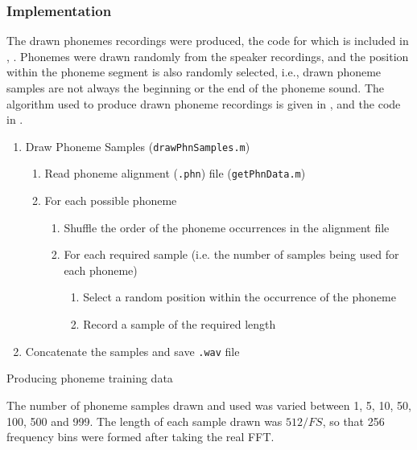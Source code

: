 \subsubsection*{Implementation}

The drawn phonemes recordings were produced, the code for which is
included in , \textit{}.
Phonemes were drawn randomly from the speaker recordings, and the
position within the phoneme segment is also randomly selected, i.e.,
drawn phoneme samples are not always the beginning or the end of the
phoneme sound. The algorithm used to produce drawn phoneme recordings
is given in , and the code in
.

\begin{algorithm}
\begin{enumerate}
\item Draw Phoneme Samples (\lstinline!drawPhnSamples.m!)

\begin{enumerate}
\item Read phoneme alignment (\lstinline!.phn!) file (\lstinline!getPhnData.m!)
\item For each possible phoneme

\begin{enumerate}
\item Shuffle the order of the phoneme occurrences in the alignment file
\item For each required sample (i.e. the number of samples being used for
each phoneme)

\begin{enumerate}
\item Select a random position within the occurrence of the phoneme
\item Record a sample of the required length
\end{enumerate}
\end{enumerate}
\end{enumerate}
\item Concatenate the samples and save \lstinline!.wav! file
\end{enumerate}
\protect\caption{\label{alg:Producing-phoneme-training}Producing phoneme training
data}


\end{algorithm}


The number of phoneme samples drawn and used was varied between 1,
5, 10, 50, 100, 500 and 999. The length of each sample drawn was $512/FS$,
so that 256 frequency bins were formed after taking the real \ac{FFT}.

